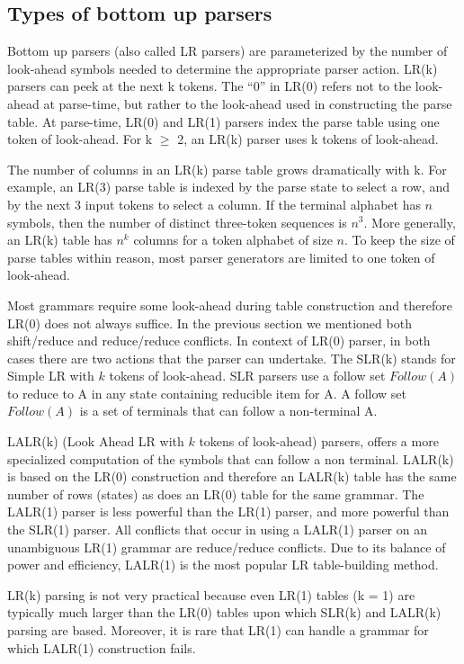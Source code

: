 \subsection{Types of bottom up parsers}

\par 
Bottom up parsers (also called LR parsers) are parameterized by the number of look-ahead symbols needed to determine the appropriate parser action. LR(k) parsers can peek at the next k tokens. The “0” in LR(0) refers not to the look-ahead at parse-time, but rather to the look-ahead used in constructing the parse table. At parse-time, LR(0) and LR(1) parsers index the parse table using one token of look-ahead. For k $\geq$ 2, an LR(k) parser uses k tokens of look-ahead. \cite[p. 189]{craftingCompiler}

\par 
The number of columns in an LR(k) parse table grows dramatically with k. For example, an LR(3) parse table is indexed by the parse state to select a row, and by the next 3 input tokens to select a column. If the terminal alphabet has $n$ symbols, then the number of distinct three-token sequences is $n^3$. More generally, an LR(k) table has $n^k$ columns for a token alphabet of size $n$. To keep the size of parse tables within reason, most parser generators are limited to one token of look-ahead.\cite[p. 189]{craftingCompiler} 

\par 
 Most grammars require some look-ahead during table construction and therefore LR(0) does not always suffice. In the previous section we mentioned both shift/reduce and reduce/reduce conflicts. In context of LR(0) parser, in both cases there are two actions that the parser can undertake. The SLR(k) stands for Simple LR with $k$ tokens of look-ahead. SLR parsers use a follow set $Follow (A)$ to reduce to A in any state containing reducible item for A. A follow set $Follow (A)$ is a set of terminals that can follow a non-terminal A.   
 
 \par
 LALR(k) (Look Ahead LR with $k$ tokens of look-ahead) parsers, offers a more specialized computation of the symbols that can follow a non terminal. LALR(k) is based on the LR(0) construction and therefore an LALR(k) table has the same number of rows (states) as does an LR(0) table for the same grammar. \cite[p. 211]{craftingCompiler}  The LALR(1) parser is less powerful than the LR(1) parser, and more powerful than the SLR(1) parser. All conflicts that occur in using a LALR(1) parser on an unambiguous LR(1) grammar are reduce/reduce conflicts. Due to its balance of power and efficiency, LALR(1) is the most popular LR table-building method. \cite[p. 211]{craftingCompiler} 
 
 \par 
 LR(k) parsing is not very practical because even LR(1) tables (k = 1) are typically much larger than the LR(0) tables upon which SLR(k) and LALR(k) parsing are based. Moreover, it is rare that LR(1) can handle a grammar for which LALR(1) construction fails.  \cite[p. 219]{craftingCompiler} 